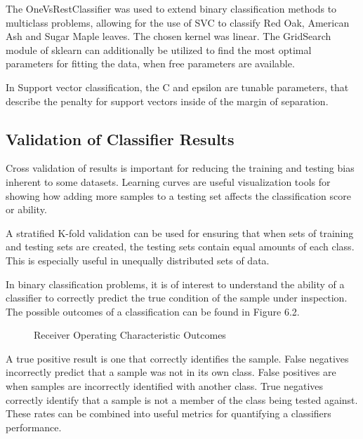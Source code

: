 %
The OneVsRestClassifier was used to extend binary classification methods to multiclass problems, allowing for the use of SVC to classify Red Oak, American Ash and Sugar Maple leaves.  The chosen kernel was linear.  The GridSearch module of sklearn can additionally be utilized to find the most optimal parameters for fitting the data, when free parameters are available.

In Support vector classification, the C and epsilon are tunable parameters, that describe the penalty for support vectors inside of the margin of separation.
\subsection{Validation of Classifier Results}
Cross validation of results is important for reducing the training and testing bias inherent to some datasets.  Learning curves are useful visualization tools for showing how adding more samples to a testing set affects the classification score or ability.

A stratified K-fold validation can be used for ensuring that when sets of training and testing sets are created, the testing sets contain equal amounts of each class.  This is especially useful in unequally distributed sets of data.

In binary classification problems, it is of interest to understand the ability of a classifier to correctly predict the true condition of the sample under inspection.  The possible outcomes of a classification can be found in Figure 6.2.
\begin{figure}
    \begin{center}
    \end{center}
    \caption{Receiver Operating Characteristic Outcomes}
    \label{fig:polarization}
\end{figure}
A true positive result is one that correctly identifies the sample.  False negatives incorrectly predict that a sample was not in its own class.  False positives are when samples are incorrectly identified with another class.  True negatives correctly identify that a sample is not a member of the class being tested against.   These rates can be combined into useful metrics for quantifying a classifiers performance.

